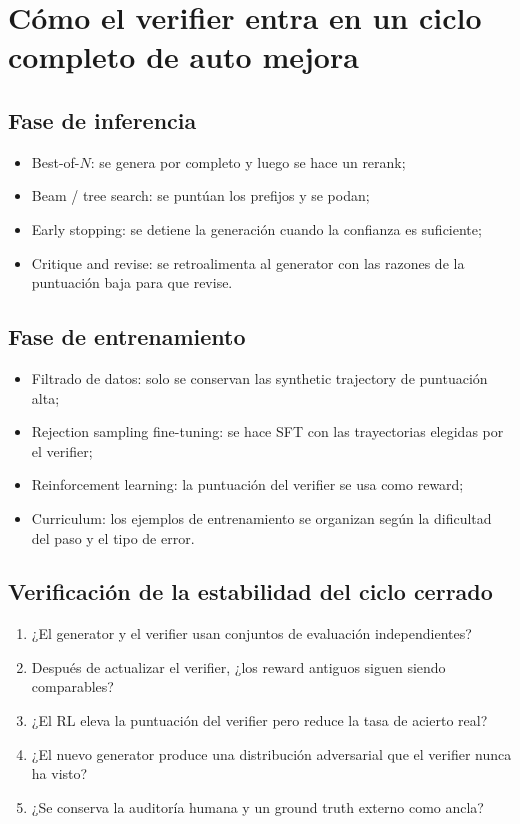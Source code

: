 \section{Cómo el verifier entra en un ciclo completo de auto mejora}

\subsection{Fase de inferencia}

\begin{itemize}
    \item Best-of-$N$: se genera por completo y luego se hace un rerank;
    \item Beam / tree search: se puntúan los prefijos y se podan;
    \item Early stopping: se detiene la generación cuando la confianza es suficiente;
    \item Critique and revise: se retroalimenta al generator con las razones de la puntuación baja para que revise.
\end{itemize}

\subsection{Fase de entrenamiento}

\begin{itemize}
    \item Filtrado de datos: solo se conservan las synthetic trajectory de puntuación alta;
    \item Rejection sampling fine-tuning: se hace SFT con las trayectorias elegidas por el verifier;
    \item Reinforcement learning: la puntuación del verifier se usa como reward;
    \item Curriculum: los ejemplos de entrenamiento se organizan según la dificultad del paso y el tipo de error.
\end{itemize}

\subsection{Verificación de la estabilidad del ciclo cerrado}

\begin{enumerate}
    \item ¿El generator y el verifier usan conjuntos de evaluación independientes?
    \item Después de actualizar el verifier, ¿los reward antiguos siguen siendo comparables?
    \item ¿El RL eleva la puntuación del verifier pero reduce la tasa de acierto real?
    \item ¿El nuevo generator produce una distribución adversarial que el verifier nunca ha visto?
    \item ¿Se conserva la auditoría humana y un ground truth externo como ancla?
\end{enumerate}


